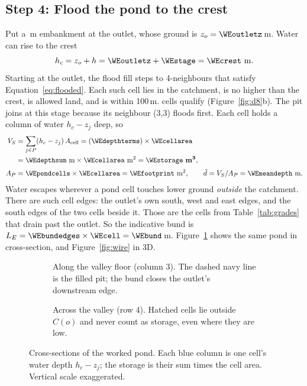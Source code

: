 \documentclass[11pt,a4paper]{article}
\newcommand{\gen}[1]{}
\begin{document}
\subsection*{Step 4: Flood the pond to the crest}
Put a \WEstage\,m embankment at the outlet, whose ground is $z_o=\WEoutletz$\,m. Water can rise to the crest
\[
h_c = z_o + h = \WEoutletz + \WEstage = \WEcrest\ \text{m}.
\]
Starting at the outlet, the flood fill steps to 4-neighbours that satisfy Equation~\ref{eq:flooded}. Each such cell lies in the catchment, is no higher than the crest, is allowed land, and is within 100\,m. \WEpondcells{} cells qualify (Figure~\ref{fig:d8}b). The pit joins at this stage because its neighbour (3,3) floods first. Each cell holds a column of water $h_c-z_j$ deep, so
\begin{align*}
V_S &= \sum_{j\in P}(h_c - z_j)\,A_{\mathrm{cell}}
     = (\WEdepthterms)\times\WEcellarea\\
    &= \WEdepthsum\ \text{m}\times\WEcellarea\ \text{m}^2 = \mathbf{\WEstorage\ m^3},\\[2pt]
A_P &= \WEpondcells\times\WEcellarea = \WEfootprint\ \text{m}^2,\qquad \bar d = V_S/A_P = \WEmeandepth\ \text{m}.
\end{align*}
Water escapes wherever a pond cell touches lower ground \emph{outside} the catchment. There are \WEbundedges{} such cell edges: the outlet's own south, west and east edges, and the south edges of the two cells beside it. Those are the cells from Table~\ref{tab:grades} that drain past the outlet. So the indicative bund is $L_E = \WEbundedges\times\WEcell = \WEbund$\,m. Figure~\ref{fig:sections} shows the same pond in cross-section, and Figure~\ref{fig:wire} in 3D.

\begin{figure}[htbp]
\centering
\begin{subfigure}[t]{0.49\linewidth}\centering
{}
\caption{Along the valley floor (column 3). The dashed navy line is the filled pit; the bund closes the outlet's downstream edge.}
\end{subfigure}\hfill
\begin{subfigure}[t]{0.49\linewidth}\centering
{}
\caption{Across the valley (row 4). Hatched cells lie outside $C(o)$ and never count as storage, even where they are low.}
\end{subfigure}
\caption{Cross-sections of the worked pond. Each blue column is one cell's water depth $h_c-z_j$; the storage is their sum times the cell area. Vertical scale exaggerated.}
\label{fig:sections}
\end{figure}
\end{document}
